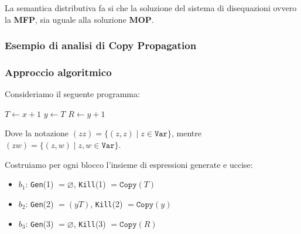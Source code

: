 La  semantica distributiva fa si che la soluzione del sistema di disequazioni ovvero la 
\textbf{MFP}, sia uguale alla soluzione \textbf{MOP}. 

\subsubsection{Esempio di analisi di Copy Propagation}
\subsubsection{Approccio algoritmico}

\begin{minipage}{0.5\textwidth}
    Consideriamo il seguente programma:

    \begin{algorithm}[H]
        $T \gets x+ 1$\;
        $y \gets T$\;
        $R \gets y + 1$\;
    \end{algorithm}

    Dove la notazione $(zz) = \{(z,z) \mid z \in \texttt{Var}\}$, mentre 
    $(zw) = \{(z,w) \mid z,w \in \texttt{Var}\}$.
    
    \end{minipage} 
    \begin{minipage}{0.5\textwidth}
    \begin{figure}[H]
        \centering
    \end{figure}
    \end{minipage}

    Costruiamo per ogni blocco l'insieme di espressioni generate e uccise:
    \begin{itemize}
        \item $b_1$: \texttt{Gen}(1) $= \varnothing$,
        \texttt{Kill}(1) $= \texttt{Copy}(T)$
        \item $b_2$: \texttt{Gen}(2) $= (y T)$, \texttt{Kill}(2) $= \texttt{Copy}(y)$
        \item $b_3$: \texttt{Gen}(3) $= \varnothing$, \texttt{Kill}(3) $= \texttt{Copy}(R)$
    \end{itemize}

